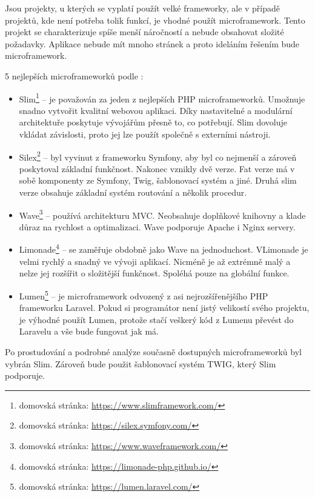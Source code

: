             Jsou projekty, u kterých se vyplatí použít velké frameworky, ale v případě projektů, kde není potřeba tolik funkcí, je vhodné použít microframework. Tento projekt se charakterizuje spíše menší náročností a nebude obsahovat složité požadavky. Aplikace nebude mít mnoho stránek a proto ideláním řešením bude microframework.
            
            5 nejlepších microframeworků podle \cite{microframeworks}:
            
            \begin{itemize}
                \item Slim\footnote{domovská stránka: \url{https://www.slimframework.com/}} – je považován za jeden z nejlepších PHP microframeworků. Umožnuje snadno vytvořit kvalitní webovou aplikaci. Díky nastavitelné a modulární architektuře poskytuje vývojářům přesně to, co potřebují. Slim dovoluje vkládat závislosti, proto jej lze použít společně s externími nástroji.
                
                \item Silex\footnote{domovská stránka: \url{https://silex.symfony.com/}} – byl vyvinut z frameworku Symfony, aby byl co nejmenší a zároveň poskytoval základní funkčnost. Nakonec vznikly dvě verze. Fat verze má v sobě komponenty ze Symfony, Twig, šablonovací systém a jiné. Druhá slim verze obsahuje základní systém routování a několik procedur. 
                
                \item Wave\footnote{domovská stránka: \url{https://www.waveframework.com/}} – používá architekturu MVC. Neobsahuje doplňkové knihovny a klade důraz na rychlost a optimalizaci. Wave podporuje Apache i Nginx servery.
                
                \item Limonade\footnote{domovská stránka: \url{https://limonade-php.github.io/}} – se zaměřuje obdobně jako Wave na jednoduchost. VLimonade je velmi rychlý a snadný ve vývoji aplikací. Nicméně je až extrémně malý a nelze jej rozšířit o složitější funkčnost. Spoléhá pouze na globální funkce.
                
                \item Lumen\footnote{domovská stránka: \url{https://lumen.laravel.com/}} – je microframework odvozený z asi nejrozšířenějšího PHP frameworku Laravel. Pokud si programátor není jistý velikostí svého projektu, je výhodné použít Lumen, protože stačí veškerý kód z Lumenu převést do Laravelu a vše bude fungovat jak má.
            \end{itemize}
        
        Po prostudování a podrobné analýze současně dostupných microframeworků byl vybrán Slim. Zároveň bude použit šablonovací systém TWIG, který Slim podporuje.
        
